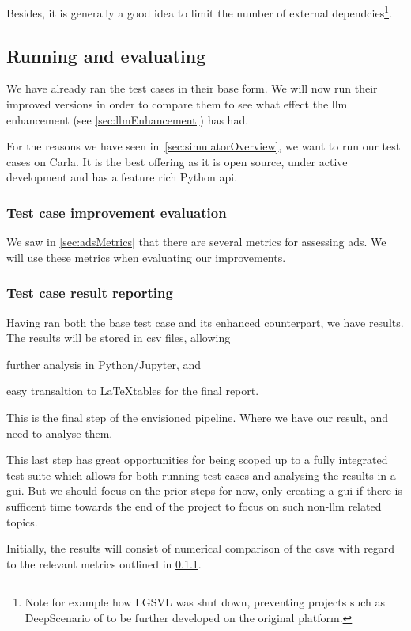 Besides, it is generally a good idea to limit the number of external dependcies\footnote{
Note for example how LGSVL\cite{lgsvl} was shut down, preventing projects such as
DeepScenario of \citeauthor{DeepScenario} to be further developed on the
original platform.}.

\subsection{Running and evaluating}

We have already ran the test cases in their base form. We will now run their
improved versions in order to compare them to see what effect the \acrshort{llm}
enhancement (see \cref{sec:llmEnhancement}) has had.

For the reasons we have seen in~\cref{sec:simulatorOverview}, we want to run our 
test cases on Carla. It is the best offering as it is open source, under active
development and has a feature rich Python \acrshort{api}.

\subsubsection{Test case improvement evaluation}\label{sec:testCaseEval}

We saw in \cref{sec:adsMetrics} that there are several metrics for assessing
\acrshort{ads}. We will use these metrics when evaluating our improvements.

\subsubsection{Test case result reporting}

Having ran both the base test case and its enhanced counterpart, we have
results. The results will be stored in \acrfull{csv} files, allowing \begin{inparaenum}
    \item further analysis in Python/Jupyter,
    and
    \item easy transaltion to \LaTeX tables for the final report.
\end{inparaenum} 

This is the final step of the envisioned pipeline. Where we have our result, and
need to analyse them.

This last step has great opportunities for being scoped up to a fully integrated
test suite which allows for both running test cases and analysing the results in
a \acrfull{gui}. But we should focus on the prior steps for now, only creating a
\acrshort{gui} if there is sufficent time towards the end of the project to
focus on such non-\acrshort{llm} related topics.

Initially, the results will consist of numerical comparison of the
\acrshort{csv}s with regard to the relevant metrics outlined in
\cref{sec:testCaseEval}.
